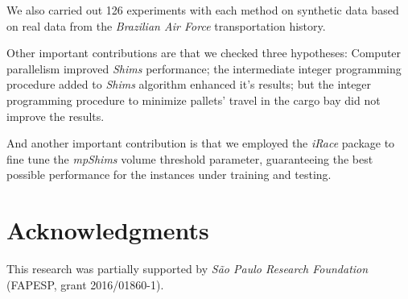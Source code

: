 \documentclass[preprint,authoryear]{elsarticle}
\begin{document}
We also carried out 126 experiments with each method on synthetic data based on real data from the {\it Brazilian Air Force} transportation history.

Other important contributions are that we checked three hypotheses: Computer parallelism improved {\it Shims} performance; the intermediate integer programming procedure added to {\it Shims} algorithm enhanced it's results; but the integer programming procedure to minimize pallets' travel in the cargo bay did not improve the results. 

And another important contribution is that we employed the {\it iRace} package \citep{LopezIbanezManuel2016} to fine tune the {\it mpShims} volume threshold parameter, guaranteeing the best possible performance for the instances under training and testing.

\section*{Acknowledgments}

This research was partially supported by \textit{São Paulo Research Foundation} (FAPESP, grant 2016/01860-1).




\end{document}
